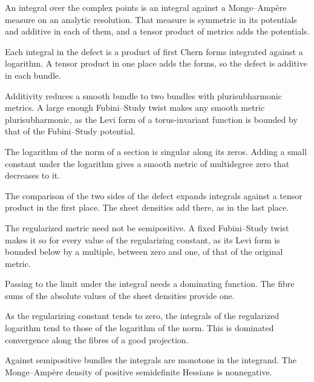 An integral over the complex points is an integral against a Monge--Amp\`ere measure on an analytic resolution. That
measure is symmetric in its potentials and additive in each of them, and a tensor product of metrics adds the
potentials.

Each integral in the defect is a product of first Chern forms integrated against a logarithm. A tensor product in one
place adds the forms, so the defect is additive in each bundle.

Additivity reduces a smooth bundle to two bundles with plurisubharmonic metrics. A large enough Fubini--Study twist
makes any smooth metric plurisubharmonic, as the Levi form of a torus-invariant function is bounded by that of the
Fubini--Study potential.

The logarithm of the norm of a section is singular along its zeros. Adding a small constant under the logarithm gives a
smooth metric of multidegree zero that decreases to it.

The comparison of the two sides of the defect expands integrals against a tensor product in the first place. The sheet
densities add there, as in the last place.

The regularized metric need not be semipositive. A fixed Fubini--Study twist makes it so for every value of the
regularizing constant, as its Levi form is bounded below by a multiple, between zero and one, of that of the original
metric.

Passing to the limit under the integral needs a dominating function. The fibre sums of the absolute values of the sheet
densities provide one.

As the regularizing constant tends to zero, the integrals of the regularized logarithm tend to those of the logarithm of
the norm. This is dominated convergence along the fibres of a good projection.

Against semipositive bundles the integrals are monotone in the integrand. The Monge--Amp\`ere density of positive
semidefinite Hessians is nonnegative.

